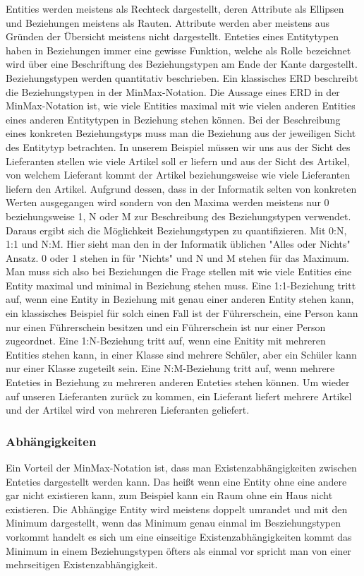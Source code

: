 \begin{flushleft}
Entities werden meistens als Rechteck dargestellt, deren Attribute als Ellipsen und Beziehungen meistens als Rauten. Attribute werden aber meistens aus Gründen der Übersicht meistens nicht dargestellt.
Enteties eines Entitytypen haben in Beziehungen immer eine gewisse Funktion, welche als Rolle bezeichnet wird über eine Beschriftung des Beziehungstypen am Ende der Kante dargestellt. Beziehungstypen werden quantitativ beschrieben. Ein klassisches ERD beschreibt die Beziehungstypen in der MinMax-Notation. Die Aussage eines ERD in der MinMax-Notation ist, wie viele Entities maximal mit wie vielen anderen Entities eines anderen Entitytypen in Beziehung stehen können. Bei der Beschreibung eines konkreten Beziehungstyps muss man die Beziehung aus der jeweiligen Sicht des Entitytyp betrachten. In unserem Beispiel müssen wir uns aus der Sicht des Lieferanten stellen wie viele Artikel soll er liefern und aus der Sicht des Artikel, von welchem Lieferant kommt der Artikel beziehungsweise wie viele Lieferanten liefern den Artikel. Aufgrund dessen, dass in der Informatik selten von konkreten Werten ausgegangen wird sondern von den Maxima werden meistens nur 0 beziehungsweise 1, N oder M zur Beschreibung des Beziehungstypen verwendet.  Daraus ergibt sich die Möglichkeit Beziehungstypen zu quantifizieren. Mit 0:N, 1:1 und N:M. Hier sieht man den in der Informatik üblichen "Alles oder Nichts" Ansatz. 0 oder 1 stehen in für "Nichts" und N und M stehen für das Maximum. Man muss sich also bei Beziehungen die Frage stellen mit wie viele Entities eine Entity maximal und minimal in Beziehung stehen muss. 
Eine 1:1-Beziehung tritt auf, wenn eine Entity in Beziehung mit genau einer anderen Entity stehen kann, ein klassisches Beispiel für solch einen Fall ist der Führerschein, eine Person kann nur einen Führerschein besitzen und ein Führerschein ist nur einer Person zugeordnet. 
Eine 1:N-Beziehung tritt auf, wenn eine Enitity mit mehreren Entities stehen kann, in einer Klasse sind mehrere Schüler, aber ein Schüler kann nur einer Klasse zugeteilt sein.
Eine N:M-Beziehung tritt auf, wenn mehrere Enteties in Beziehung zu mehreren anderen Enteties stehen können. Um wieder auf unseren Lieferanten zurück zu kommen, ein Lieferant liefert mehrere Artikel und der Artikel wird von mehreren Lieferanten geliefert.

\subsubsection{Abhängigkeiten}
Ein Vorteil der MinMax-Notation ist, dass man Existenzabhängigkeiten zwischen Enteties dargestellt werden kann. Das heißt wenn eine Entity ohne eine andere gar nicht existieren kann, zum Beispiel kann ein Raum ohne ein Haus nicht existieren. Die Abhängige Entity wird meistens doppelt umrandet und mit den Minimum dargestellt, wenn das Minimum genau einmal im Besziehungstypen vorkommt handelt es sich um eine einseitige Existenzabhängigkeiten kommt das Minimum in einem Beziehungstypen öfters als einmal vor spricht man von einer mehrseitigen Existenzabhängigkeit.


\end{flushleft}
